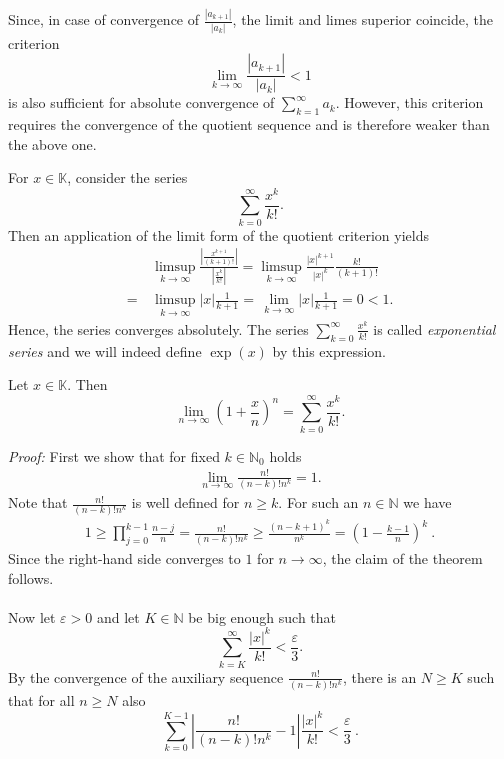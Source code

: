 \begin{Remark}{}
Since, in case of convergence of $\frac{|a_{k+1}|}{|a_{k}|}$, the limit and limes superior coincide, the criterion
\[\lim_{k\to\infty}\frac{|a_{k+1}|}{|a_{k}|}<1\]
is also sufficient for absolute convergence of $\sum_{k=1}^\infty a_k$. However, this criterion requires the convergence of the quotient sequence and is therefore weaker than the above one.
\end{Remark}


\begin{example}\label{ex:expser}
 For $x\in\mathbb{K}$, consider the series
\[\sum_{k=0}^\infty\frac{x^k}{k!}.\]
Then an application of the limit form of the quotient criterion yields
\[\begin{aligned}
&\,\limsup_{k \rightarrow \infty}\frac{\left|\frac{x^{k+1}}{(k+1)!}\right|}{\left|\frac{x^k}{k!}\right|}
=\limsup_{k \rightarrow \infty}\frac{|x|^{k+1}}{|x|^k}\frac{k!}{(k+1)!}\\
=&\,\limsup_{k \rightarrow \infty}|x|\frac1{k+1}
=\,\lim_{k\to\infty}|x|\frac1{k+1}=0<1.
\end{aligned}\]
Hence, the series converges absolutely. The series $\sum_{k=0}^\infty\frac{x^k}{k!}$ is called \emph{exponential series} and we will indeed define $\exp(x)$ by this expression.
\end{example}

\begin{Theorem}{}
Let $x\in\mathbb{K}$. Then
$$
\lim_{n\rightarrow\infty}\left(1+\frac{x}{n}\right)^{n} = \sum_{k=0}^{\infty}\frac{x^{k}}{k!}.
$$
\end{Theorem}
{\em Proof:}
First we show that for fixed $k\in\mathbb{N}_0$ holds
\begin{eqnarray}\label{seqexp}
 \lim_{n\rightarrow \infty} \frac{n!}{(n-k)!n^k} = 1.
\end{eqnarray}\label{seqexp2}
Note that $\frac{n!}{(n-k)!n^k}$ is well defined for $n\geq k$. For such an $n\in\mathbb{N}$ we have
\begin{eqnarray}
  1\geq \prod_{j=0}^{k-1} \frac{n-j}{n} = \frac{n!}{(n-k)!n^k}\geq \frac{(n-k+1)^k}{n^k}=(1-\frac{k-1}{n})^k \ .
\end{eqnarray}
Since the right-hand side converges to $1$ for $n\rightarrow \infty$, the claim of the theorem follows.
\\ \\
Now let $\varepsilon>0$ and let $K\in\mathbb{N}$ be big enough such that 
$$
\sum_{k=K}^{\infty}\frac{|x|^{k}}{k!}<\frac{\varepsilon}{3}.
$$
By the convergence of the auxiliary sequence $\frac{n!}{(n-k)!n^k}$, there is an $N\geq K$ such that for all $n\geq N$ also
$$\sum_{k=0}^{K-1}\left|\frac{n!}{(n-k)!n^k}-1\right|\frac{|x|^{k}}{k!} <\frac{\varepsilon}{3} \ . $$

